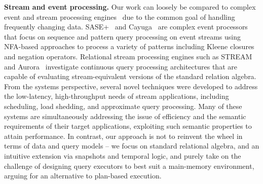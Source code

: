 
\noindent \textbf{Stream and event processing.}
Our work can loosely be compared to complex event and stream processing
engines~\cite{wu-sigmod:06,agrawal-sigmod:08,white-pods:07,motwani-cidr:03,abadi-vldbj:03}
due to the common goal of handling frequently changing data.
SASE+~\cite{agrawal-sigmod:08} and Cayuga~\cite{white-pods:07} are complex event
processors that focus on sequence and pattern query processing on event streams
using NFA-based approaches to process a variety of patterns including Kleene
closures and negation operators. Relational stream processing engines such as
STREAM~\cite{motwani-cidr:03} and Aurora~\cite{abadi-vldbj:03} investigate
continuous query processing architectures that are capable of evaluating
stream-equivalent versions of the standard relation algebra. From the systems
perspective, several novel techniques were developed to address the low-latency,
high-throughput needs of stream applications, including scheduling, load
shedding, and approximate query processing.
Many of these systems are simultaneously addressing the issue of efficiency and
the semantic requirements of their target applications, exploiting such semantic
properties to attain performance. In contrast, our approach is not to reinvent
the wheel in terms of data and query models -- we focus on standard relational
algebra, and an intuitive extension via snapshots and temporal logic, and purely
take on the challenge of designing query executors to best suit a main-memory
environment, arguing for an alternative to plan-based execution.

